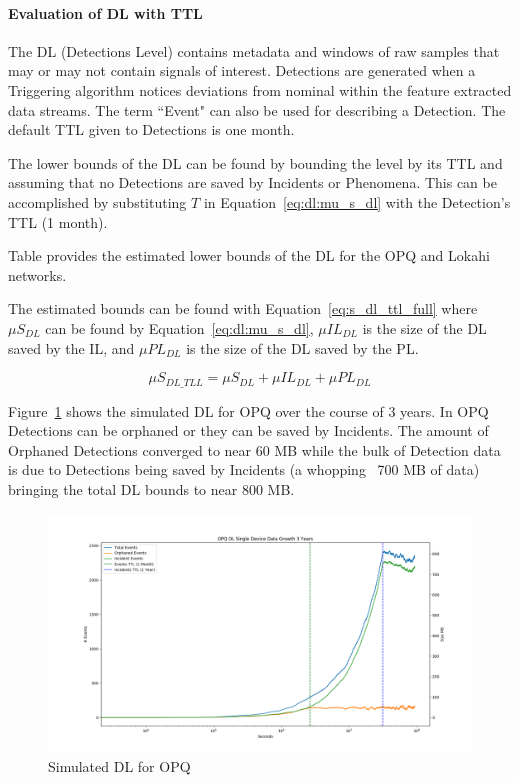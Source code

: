 \paragraph{Evaluation of DL with TTL}

The DL (Detections Level) contains metadata and windows of raw samples that may or may not contain signals of interest. Detections are generated when a Triggering algorithm notices deviations from nominal within the feature extracted data streams. The term ``Event" can also be used for describing a Detection. The default TTL given to Detections is one month.

The lower bounds of the DL can be found by bounding the level by its TTL and assuming that no Detections are saved by Incidents or Phenomena. This can be accomplished by substituting $T$ in Equation~\ref{eq:dl:mu_s_dl} with the Detection's TTL (1 month).

Table provides the estimated lower bounds of the DL for the OPQ and Lokahi networks.


The estimated bounds can be found with Equation~\ref{eq:s_dl_ttl_full} where $\mu S_{DL}$ can be found by Equation~\ref{eq:dl:mu_s_dl}, $\mu IL_{DL}$ is the size of the DL saved by the IL, and $\mu PL_{DL}$ is the size of the DL saved by the PL.

\begin{equation}\label{eq:s_dl_ttl_full}
	\mu S_{DL\_TLL} = \mu S_{DL} + \mu IL_{DL} + \mu PL_{DL}
\end{equation}

Figure~\ref{fig:sim_dl_opq} shows the simulated DL for OPQ over the course of 3 years. In OPQ Detections can be orphaned or they can be saved by Incidents. The amount of Orphaned Detections converged to near 60 MB while the bulk of Detection data is due to Detections being saved by Incidents (a whopping ~700 MB of data) bringing the total DL bounds to near 800 MB\@.

\begin{figure}[H]
	\centering
	\includegraphics[width=\linewidth]{figures/sim_dl_opq.png}
	\caption{Simulated DL for OPQ}
	\label{fig:sim_dl_opq}
\end{figure}

